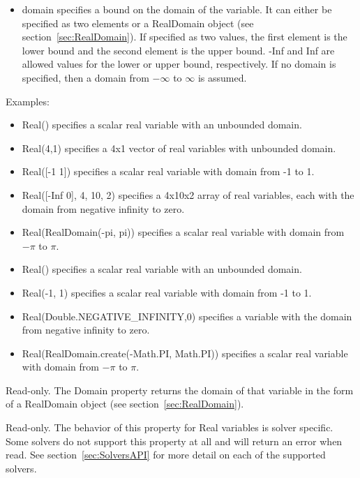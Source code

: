 \ifjava
\begin{itemize}
\item domain specifies a bound on the domain of the variable. It can either be specified as two elements or a RealDomain object (see section~\ref{sec:RealDomain}).  If specified as two values, the first element is the lower bound and the second element is the upper bound. -Inf and Inf are allowed values for the lower or upper bound, respectively.  If no domain is specified, then a domain from $-\infty$ to $\infty$ is assumed.
\end{itemize}
\fi

Examples:

\ifmatlab
\begin{itemize}
\item Real() specifies a scalar real variable with an unbounded domain.
\item Real(4,1) specifies a 4x1 vector of real variables with unbounded domain.
\item Real([-1 1]) specifies a scalar real variable with domain from -1 to 1.
\item Real([-Inf 0], 4, 10, 2) specifies a 4x10x2 array of real variables, each with the domain from negative infinity to zero.
\item Real(RealDomain(-pi, pi)) specifies a scalar real variable with domain from $-\pi$ to $\pi$.
\end{itemize}
\fi

\ifjava
\begin{itemize}
\item Real() specifies a scalar real variable with an unbounded domain.
\item Real(-1, 1) specifies a scalar real variable with domain from -1 to 1.
\item Real(Double.NEGATIVE\_INFINITY,0) specifies a variable with the domain from negative infinity to zero.
\item Real(RealDomain.create(-Math.PI, Math.PI)) specifies a scalar real variable with domain from $-\pi$ to $\pi$.
\end{itemize}
\fi




Read-only.  The Domain property returns the domain of that variable in the form of a RealDomain object (see section~\ref{sec:RealDomain}).


Read-only.  The behavior of this property for Real variables is solver specific.  Some solvers do not support this property at all and will return an error when read.  See section~\ref{sec:SolversAPI} for more detail on each of the supported solvers.

